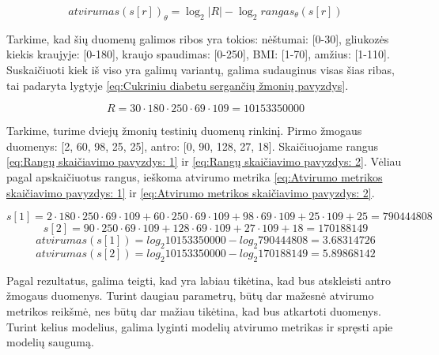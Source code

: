 \documentclass{VUMIFInfBakalaurinis}
\begin{document}
\begin{equation}
atvirumas(s[r])_{\theta} = \log_{2}|R| - \log_{2}rangas_{\theta}(s[r])
\label{eq:Atvirumo metrika skaičiuojant rangą}
\end{equation}

\par Tarkime, kad šių duomenų galimos ribos yra tokios: nėštumai: [0-30], gliukozės kiekis kraujyje: [0-180], kraujo spaudimas: [0-250], BMI: [1-70], amžius: [1-110]. Suskaičiuoti kiek iš viso yra galimų variantų, galima sudauginus visas šias ribas, tai padaryta lygtyje \eqref{eq:Cukriniu diabetu sergančių žmonių pavyzdys}.

\begin{equation}
R = 30 \cdot 180 \cdot 250 \cdot 69 \cdot 109 = 10153350000
\label{eq:Cukriniu diabetu sergančių žmonių pavyzdys}
\end{equation}

\par Tarkime, turime dviejų žmonių testinių duomenų rinkinį. Pirmo žmogaus duomenys: [2, 60, 98, 25, 25], antro: [0, 90, 128, 27, 18]. Skaičiuojame rangus \eqref{eq:Rangų skaičiavimo pavyzdys: 1} ir \eqref{eq:Rangų skaičiavimo pavyzdys: 2}. Vėliau pagal apskaičiuotus rangus, ieškoma atvirumo metrika \eqref{eq:Atvirumo metrikos skaičiavimo pavyzdys: 1} ir \eqref{eq:Atvirumo metrikos skaičiavimo pavyzdys: 2}.

\begin{equation}
s[1] = 2 \cdot 180 \cdot 250 \cdot 69 \cdot 109 + 60 \cdot 250 \cdot 69 \cdot 109 + 98 \cdot 69 \cdot 109 + 25 \cdot 109 + 25 = 790444808
\label{eq:Rangų skaičiavimo pavyzdys: 1}
\end{equation}
\begin{equation}
s[2] = 90 \cdot 250 \cdot 69 \cdot 109 + 128 \cdot 69 \cdot 109 + 27 \cdot 109 + 18 = 170188149
\label{eq:Rangų skaičiavimo pavyzdys: 2}
\end{equation}
\begin{equation}
atvirumas(s[1]) = log_{2} 10153350000 - log_{2} 790444808 = 3.68314726
\label{eq:Atvirumo metrikos skaičiavimo pavyzdys: 1}
\end{equation}
\begin{equation}
atvirumas(s[2]) = log_{2} 10153350000 - log_{2} 170188149 = 5.89868142
\label{eq:Atvirumo metrikos skaičiavimo pavyzdys: 2}
\end{equation}

\par Pagal rezultatus, galima teigti, kad yra labiau tikėtina, kad bus atskleisti antro žmogaus duomenys. Turint daugiau parametrų, būtų dar mažesnė atvirumo metrikos reikšmė, nes būtų dar mažiau tikėtina, kad bus atkartoti duomenys. Turint kelius modelius, galima lyginti modelių atvirumo metrikas ir spręsti apie modelių saugumą.
\end{document}
